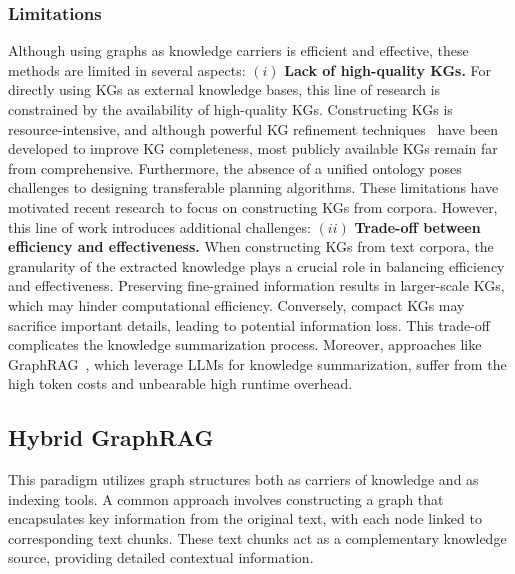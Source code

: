 \documentclass[lettersize,journal]{IEEEtran}
\begin{document}
\subsubsection{Limitations}
Although using graphs as knowledge carriers is efficient and effective, these methods are limited in several aspects:
$(i)$ \textbf{Lack of high-quality KGs.} For directly using KGs as external knowledge bases, this line of research is constrained by the availability of high-quality KGs. Constructing KGs is resource-intensive, and although powerful KG refinement techniques~\cite{difflogic,LLM4EA,neusymea,Zhang-etal22Contrastive,dong2023active,zhang2023integrating}
have been developed to improve KG completeness, most publicly available KGs remain far from comprehensive. Furthermore, the absence of a unified ontology poses challenges to designing transferable planning algorithms. These limitations have motivated recent research to focus on constructing KGs from corpora. However, this line of work introduces additional challenges:
$(ii)$ \textbf{Trade-off between efficiency and effectiveness.} 
When constructing KGs from text corpora, the granularity of the extracted knowledge plays a crucial role in balancing efficiency and effectiveness. Preserving fine-grained information results in larger-scale KGs, which may hinder computational efficiency. Conversely, compact KGs may sacrifice important details, leading to potential information loss. This trade-off complicates the knowledge summarization process. Moreover, approaches like GraphRAG~\cite{edge2024local}, which leverage LLMs for knowledge summarization, suffer from the high token costs and unbearable high runtime overhead.




\subsection{Hybrid GraphRAG}

This paradigm utilizes graph structures both as carriers of knowledge and as indexing tools. A common approach involves constructing a graph that encapsulates key information from the original text, with each node linked to corresponding text chunks. These text chunks act as a complementary knowledge source, providing detailed contextual information. 
\end{document}
